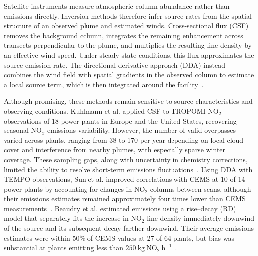 \documentclass[sigconf,nonacm]{acmart}
\newcommand{\NOx}{NO$_x$}
\begin{document}
Satellite instruments measure atmospheric column abundance rather than emissions
directly. Inversion methods therefore infer source rates from the
spatial structure of an observed plume and estimated winds. Cross-sectional flux
(CSF) removes the background column, integrates the remaining enhancement across
transects perpendicular to the plume, and multiplies the resulting line density by
an effective wind speed. Under steady-state conditions, this flux approximates the
source emission rate. The directional derivative approach (DDA) instead combines
the wind field with spatial gradients in the observed column to estimate a local
source term, which is then integrated around the
facility~\cite{santaren2025benchmarking,sun2025hourly}.

Although promising, these methods remain sensitive to source characteristics and
observing conditions. Kuhlmann et al. applied CSF to TROPOMI NO$_2$ observations of
18 power plants in Europe and the United States, recovering seasonal \NOx{}
emissions variability. However, the number of valid overpasses varied across plants,
ranging from 38 to 170 per year depending on local cloud cover and interference
from nearby plumes, with especially sparse winter coverage. These sampling gaps, along with uncertainty in chemistry
corrections, limited the ability to resolve short-term emissions
fluctuations~\cite{kuhlmann2026temporal}. Using DDA with TEMPO observations, Sun et al. improved
correlations with CEMS at 10 of 14 power plants by accounting for changes in NO$_2$
columns between scans, although their emissions estimates remained approximately
four times lower than CEMS measurements~\cite{sun2025hourly}. Beaudry et al. estimated emissions using a rise--decay (RD) model that
separately fits the increase in NO$_2$ line density immediately downwind of the
source and its subsequent decay farther downwind. Their average emissions
estimates were within 50\% of CEMS values at 27 of 64 plants, but bias was
substantial at plants emitting less than
\(250~\mathrm{kg~NO_2~h^{-1}}\)~\cite{beaudry2026quantification}.
\end{document}
